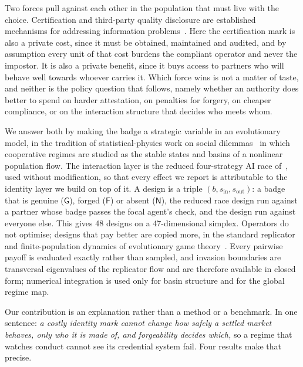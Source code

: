 Two forces pull against each other in the population that must live with the
choice. Certification and third-party quality disclosure are established
mechanisms for addressing information problems~\citep{dranove2010quality}. Here
the certification mark is also a private cost, since it must be obtained,
maintained and audited, and by assumption every unit of that cost burdens the
compliant operator and never the impostor. It is also a private benefit, since
it buys access to partners who will behave well towards whoever carries it.
Which force wins is not a matter of taste, and neither is the policy question
that follows, namely whether an authority does better to spend on harder
attestation, on penalties for forgery, on cheaper compliance, or on the
interaction structure that decides who meets whom.

We answer both by making the badge a strategic variable in an evolutionary
model, in the tradition of statistical-physics work on social
dilemmas~\citep{perc2017statphys} in which cooperative regimes are studied as
the stable states and basins of a nonlinear population flow. The interaction
layer is the reduced four-strategy AI race of~\citet{domingos2026falling}, used
without modification, so that every effect we report is attributable to the
identity layer we build on top of it. A design is a triple
$(b, s_{\mathrm{in}}, s_{\mathrm{out}})$: a badge that is genuine
($\mathsf{G}$), forged ($\mathsf{F}$) or absent ($\mathsf{N}$), the reduced race
design run against a partner whose badge passes the focal agent's check, and the
design run against everyone else. This gives 48 designs on a 47-dimensional
simplex. Operators do not optimise; designs that pay better are copied more, in
the standard replicator and finite-population dynamics of evolutionary game
theory~\citep{taylor1978ess,hofbauer1998evolutionary,traulsen2006stochastic}.
Every pairwise payoff is evaluated exactly rather than sampled, and invasion
boundaries are transversal eigenvalues of the replicator flow and are therefore
available in closed form; numerical integration is used only for basin
structure and for the global regime map.

Our contribution is an explanation rather than a method or a benchmark. In one
sentence: \emph{a costly identity mark cannot change how safely a settled market
behaves, only who it is made of, and forgeability decides which,} so a regime
that watches conduct cannot see its credential system fail. Four results make
that precise.

